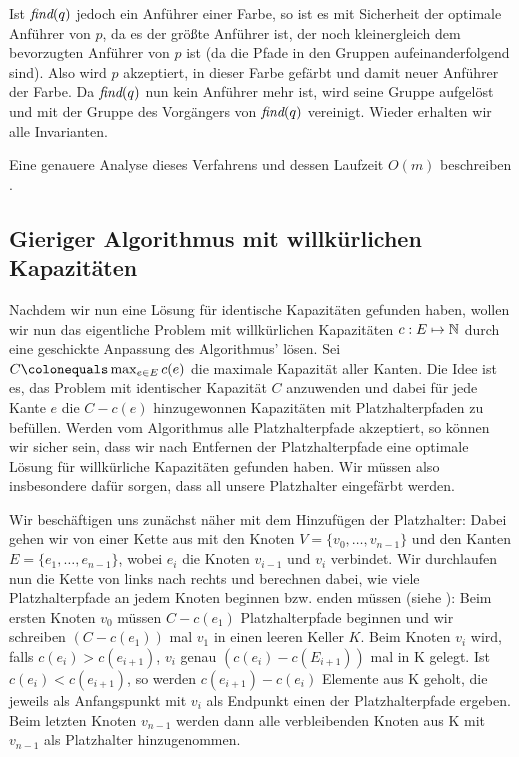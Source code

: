 Ist $\text{\em find}(q)$ jedoch ein Anführer einer Farbe, so ist es mit Sicherheit der optimale Anführer von $p$, da es der größte
Anführer ist, der noch kleinergleich dem bevorzugten Anführer von $p$ ist (da die Pfade in den Gruppen
aufeinanderfolgend sind).
Also wird $p$ akzeptiert, in dieser Farbe gefärbt und damit neuer Anführer der Farbe.
Da $\text{\em find}(q)$ nun kein Anführer mehr ist, wird seine Gruppe aufgelöst und mit der Gruppe des Vorgängers von $\text{\em find}(q)$
vereinigt.
Wieder erhalten wir alle Invarianten.

Eine genauere Analyse dieses Verfahrens und dessen Laufzeit $O(m)$ beschreiben .

\subsection{Gieriger Algorithmus mit willkürlichen Kapazitäten}\label{subsec:anpassenAnWillkürlicheKapazitäten}

Nachdem wir nun eine Lösung für identische Kapazitäten gefunden haben, wollen wir nun das eigentliche Problem mit
willkürlichen Kapazitäten $c: E \mapsto \mathbb N$ durch eine geschickte Anpassung des Algorithmus' lösen.
Sei $C \colonequals \max_{e \in E} c(e)$ die maximale Kapazität aller Kanten.
Die Idee ist es, das Problem mit identischer Kapazität $C$ anzuwenden und dabei für jede Kante $e$ die $C - c(e)$
hinzugewonnen Kapazitäten mit Platzhalterpfaden zu befüllen.
Werden vom Algorithmus alle Platzhalterpfade akzeptiert, so können wir sicher sein, dass wir nach Entfernen der
Platzhalterpfade eine optimale Lösung für willkürliche Kapazitäten gefunden haben.
Wir müssen also insbesondere dafür sorgen, dass all unsere Platzhalter eingefärbt werden.

Wir beschäftigen uns zunächst näher mit dem Hinzufügen der Platzhalter:
Dabei gehen wir von einer Kette aus mit den Knoten $V=\{v_0,\dots,v_{n-1}\}$ und den Kanten
$E=\{e_1,\dots,e_{n-1}\}$, wobei $e_i$ die Knoten $v_{i-1}$ und $v_i$ verbindet.
Wir durchlaufen nun die Kette von links nach rechts und berechnen dabei, wie viele Platzhalterpfade an jedem Knoten
beginnen bzw. enden müssen (siehe ):
Beim ersten Knoten $v_0$ müssen $C - c(e_1)$ Platzhalterpfade beginnen und wir schreiben $(C - c(e_1))$ mal $v_1$ in einen
leeren Keller $K$.
Beim Knoten $v_i$ wird, falls $c(e_i) > c(e_{i+1})$, $v_i$ genau $(c(e_i) - c(E_{i+1}))$ mal in K gelegt.
Ist $c(e_i) < c(e_{i+1})$, so werden $c(e_{i+1}) - c(e_i)$ Elemente aus K geholt, die jeweils als Anfangspunkt mit $v_i$
als Endpunkt einen der Platzhalterpfade ergeben.
Beim letzten Knoten $v_{n-1}$ werden dann alle verbleibenden Knoten aus K mit $v_{n-1}$ als Platzhalter hinzugenommen.

